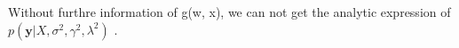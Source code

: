 \documentclass[11pt]{article}
\newcommand{\mbf}[1]{{\boldsymbol{\mathbf{#1}}}}
\renewcommand{\bm}{\mbf}
\begin{document}
\begin{enumerate}
\begin{enumerate}[label=(\alph*)]
Without furthre information of g(w, x), we can not get the analytic expression of $p(\bm{y} | X, \sigma^2, \gamma^2, \lambda^2)$ .

\end{enumerate}





\end{enumerate}
\end{document}
